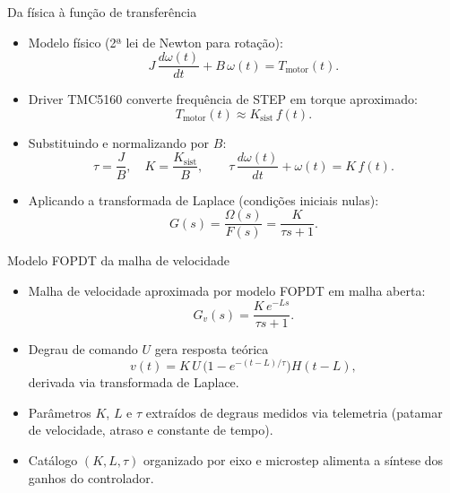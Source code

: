 \documentclass{beamer}
\begin{document}
\begin{frame}{Da física à função de transferência}
  \begin{itemize}
    \item Modelo físico (2ª lei de Newton para rotação):
      \[
        J\,\frac{d\omega(t)}{dt} + B\,\omega(t) = T_{\text{motor}}(t).
      \]
    \item Driver TMC5160 converte frequência de STEP em torque aproximado:
      \[
        T_{\text{motor}}(t) \approx K_{\text{sist}}\,f(t).
      \]
    \item Substituindo e normalizando por $B$:
      \[
        \tau = \frac{J}{B},\quad K = \frac{K_{\text{sist}}}{B},
      \qquad
        \tau\,\frac{d\omega(t)}{dt} + \omega(t) = K\,f(t).
      \]
    \item Aplicando a transformada de Laplace (condições iniciais nulas):
      \[
        G(s) = \frac{\Omega(s)}{F(s)} = \frac{K}{\tau s + 1}.
      \]
  \end{itemize}
\end{frame}

\begin{frame}{Modelo FOPDT da malha de velocidade}
  \begin{itemize}
    \item Malha de velocidade aproximada por modelo FOPDT em malha aberta:
      \[
        G_v(s) = \frac{K\,e^{-Ls}}{\tau s + 1}.
      \]
    \item Degrau de comando $U$ gera resposta teórica
      \[
        v(t) = K\,U\,\bigl(1 - e^{-(t-L)/\tau}\bigr) H(t-L),
      \]
      derivada via transformada de Laplace.
    \item Parâmetros $K$, $L$ e $\tau$ extraídos de degraus medidos via telemetria
      (patamar de velocidade, atraso e constante de tempo).
    \item Catálogo $(K,L,\tau)$ organizado por eixo e microstep alimenta a síntese dos ganhos do controlador.
  \end{itemize}
\end{frame}
\end{document}

